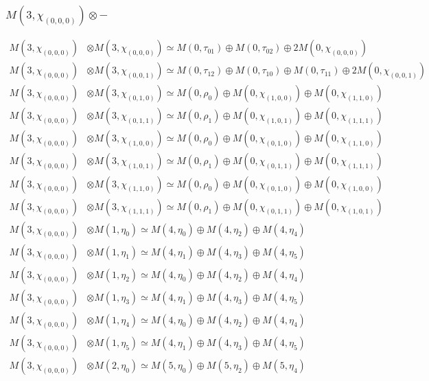 \subsubsection{$ M(3,\chi_{(0,0,0)})\otimes -$}
\begin{align*}
M(3,\chi_{(0,0,0)}) &\otimes M(3,\chi_{(0,0,0)}) \simeq M(0,\tau_{01}) \oplus M(0,\tau_{02}) \oplus 2 M(0,\chi_{(0,0,0)}) \\
M(3,\chi_{(0,0,0)}) &\otimes M(3,\chi_{(0,0,1)}) \simeq M(0,\tau_{12}) \oplus M(0,\tau_{10}) \oplus M(0,\tau_{11}) \oplus 2 M(0,\chi_{(0,0,1)}) \\
M(3,\chi_{(0,0,0)}) &\otimes M(3,\chi_{(0,1,0)}) \simeq M(0,\rho_{0}) \oplus M(0,\chi_{(1,0,0)}) \oplus M(0,\chi_{(1,1,0)}) \\
M(3,\chi_{(0,0,0)}) &\otimes M(3,\chi_{(0,1,1)}) \simeq M(0,\rho_{1}) \oplus M(0,\chi_{(1,0,1)}) \oplus M(0,\chi_{(1,1,1)}) \\
M(3,\chi_{(0,0,0)}) &\otimes M(3,\chi_{(1,0,0)}) \simeq M(0,\rho_{0}) \oplus M(0,\chi_{(0,1,0)}) \oplus M(0,\chi_{(1,1,0)}) \\
M(3,\chi_{(0,0,0)}) &\otimes M(3,\chi_{(1,0,1)}) \simeq M(0,\rho_{1}) \oplus M(0,\chi_{(0,1,1)}) \oplus M(0,\chi_{(1,1,1)}) \\
M(3,\chi_{(0,0,0)}) &\otimes M(3,\chi_{(1,1,0)}) \simeq M(0,\rho_{0}) \oplus M(0,\chi_{(0,1,0)}) \oplus M(0,\chi_{(1,0,0)}) \\
M(3,\chi_{(0,0,0)}) &\otimes M(3,\chi_{(1,1,1)}) \simeq M(0,\rho_{1}) \oplus M(0,\chi_{(0,1,1)}) \oplus M(0,\chi_{(1,0,1)}) \\
M(3,\chi_{(0,0,0)}) &\otimes M(1,\eta_{0}) \simeq M(4,\eta_{0}) \oplus M(4,\eta_{2}) \oplus M(4,\eta_{4}) \\
M(3,\chi_{(0,0,0)}) &\otimes M(1,\eta_{1}) \simeq M(4,\eta_{1}) \oplus M(4,\eta_{3}) \oplus M(4,\eta_{5}) \\
M(3,\chi_{(0,0,0)}) &\otimes M(1,\eta_{2}) \simeq M(4,\eta_{0}) \oplus M(4,\eta_{2}) \oplus M(4,\eta_{4}) \\
M(3,\chi_{(0,0,0)}) &\otimes M(1,\eta_{3}) \simeq M(4,\eta_{1}) \oplus M(4,\eta_{3}) \oplus M(4,\eta_{5}) \\
M(3,\chi_{(0,0,0)}) &\otimes M(1,\eta_{4}) \simeq M(4,\eta_{0}) \oplus M(4,\eta_{2}) \oplus M(4,\eta_{4}) \\
M(3,\chi_{(0,0,0)}) &\otimes M(1,\eta_{5}) \simeq M(4,\eta_{1}) \oplus M(4,\eta_{3}) \oplus M(4,\eta_{5}) \\
M(3,\chi_{(0,0,0)}) &\otimes M(2,\eta_{0}) \simeq M(5,\eta_{0}) \oplus M(5,\eta_{2}) \oplus M(5,\eta_{4}) \\

\end{align*}

